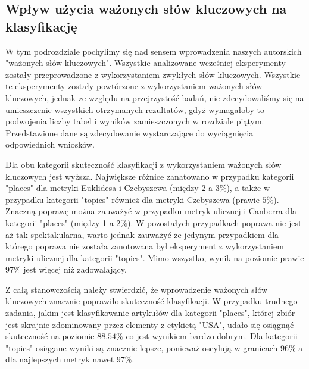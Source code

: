 \documentclass{classrep}
\begin{document}
\subsection{Wpływ użycia ważonych słów kluczowych na klasyfikację}
W tym podrozdziale pochylimy się nad sensem wprowadzenia naszych autorskich "ważonych słów kluczowych". Wszystkie analizowane wcześniej eksperymenty zostały przeprowadzone z wykorzystaniem zwykłych słów kluczowych. Wszystkie te eksperymenty zostały powtórzone z wykorzystaniem ważonych słów kluczowych, jednak ze względu na przejrzystość badań, nie zdecydowaliśmy się na umieszczenie wszystkich otrzymanych rezultatów, gdyż wymagałoby to podwojenia liczby tabel i wyników zamieszczonych w rozdziale piątym. Przedstawione dane są zdecydowanie wystarczające do wyciągnięcia odpowiednich wniosków. \newline

Dla obu kategorii skuteczność klasyfikacji z wykorzystaniem ważonych słów kluczowych jest wyższa. Największe różnice zanatowano w przypadku kategorii "places" dla metryki Euklidesa i Czebyszewa (między 2 a $3\%$), a także w przypadku kategorii "topics" również dla metryki Czebyszewa (prawie $5\%$). Znaczną poprawę można zauważyć w przypadku metryk ulicznej i Canberra dla kategorii "places" (między 1 a $2\%$). W pozostałych przypadkach poprawa nie jest aż tak spektakularna, warto jednak zauważyć że jedynym przypadkiem dla którego poprawa nie została zanotowana był eksperyment z wykorzystaniem metryki ulicznej dla kategorii "topics". Mimo wszystko, wynik na poziomie prawie $97\%$ jest więcej niż zadowalający. \newline

Z całą stanowczością należy stwierdzić, że wprowadzenie ważonych słów kluczowych znacznie poprawiło skuteczność klasyfikacji. W przypadku trudnego zadania, jakim jest klasyfikowanie artykułów dla kategorii "places", której zbiór jest skrajnie zdominowany przez elementy z etykietą "USA", udało się osiągnąć skuteczność na poziomie $88.54\%$ co jest wynikiem bardzo dobrym. Dla kategorii "topics" osiągane wyniki są znacznie lepsze, ponieważ oscylują w granicach $96\%$ a dla najlepszych metryk nawet $97\%$.
\end{document}

